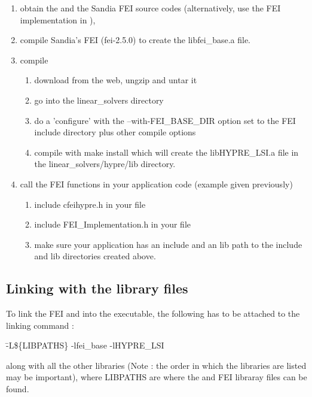\begin{enumerate}

\item obtain the \hypre{} and the Sandia FEI source codes (alternatively, use
      the {\sf FEI} implementation in \hypre{}),
\item compile Sandia's {\sf FEI} (fei-2.5.0) to create the
      {\sf libfei\_base.a} file.
\item compile \hypre{} 
\begin{enumerate}
\item download \hypre{} from the web, ungzip and untar it
\item go into the {\sf linear\_solvers} directory
\item do a 'configure' with the {\sf --with-FEI\_BASE\_DIR} option set to
      the {\sf FEI} include directory plus other compile options
\item compile with {\sf make install} which will create the
      {\sf libHYPRE\_LSI.a} file in the {\sf linear\_solvers/hypre/lib}
      directory.
\end{enumerate}
\item call the {\sf FEI} functions in your application code (example given
      previously)
\begin{enumerate}
\item include {\sf cfei\-hypre.h} in your file 
\item include {\sf FEI\_Implementation.h} in your file 
\item make sure your application has an {\sf include} and an {\sf lib} path 
      to the {\sf include} and {\sf lib} directories created above. 
\end{enumerate}

\end{enumerate}

\subsection{Linking with the library files}

To link the {\sf FEI} and \hypre{} into the executable, the following has to be
attached to the linking command :

\begin{tabbing}
\hspace{0.5in} \= {\sf -L\$\{LIBPATHS\} -lfei\_base -lHYPRE\_LSI} 
\end{tabbing}
along with all the other libraries (Note : the order in which the libraries are
listed may be important), where {\sf LIBPATHS} are where 
the \hypre{} and {\sf FEI} libraray files can be found.  

